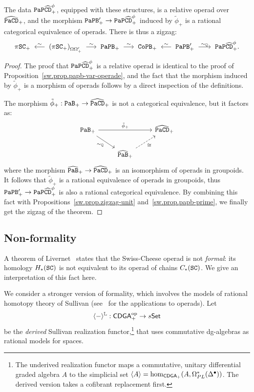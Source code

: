 \begin{theorem} \label{sw.thm.rat-model}
  The data $\mathtt{PaP}\widehat{\mathtt{CD}}_{+}^{\phi}$, equipped with these structures, is a relative operad over $\widehat{\mathtt{PaCD}}_{+}$, and the morphism $\mathtt{PaPB}'_{+} \to \mathtt{PaP}\widehat{\mathtt{CD}}_{+}^{\phi}$ induced by $\tilde\phi_{+}$ is a rational categorical equivalence of operads.
  There is thus a zigzag:
  \[ \pi \SC_{+} \qiso* \left( \pi \SC_{+} \right)_{\tMagma'_{+}} \qiso \PaPB_{+} \qiso \CoPB_{+} \qiso* \PaPB'_{+} \tkrightarrow{\sim_{\Q}} \PaPCD^{\phi}. \]
\end{theorem}

\begin{proof}
  The proof that $\mathtt{PaP}\widehat{\mathtt{CD}}_{+}^{\phi}$ is a relative operad is identical to the proof of Proposition~\ref{sw.prop.papb-var-operade}, and the fact that the morphism induced by $\tilde\phi_{+}$ is a morphism of operads follows by a direct inspection of the definitions.

  The morphism $\tilde\phi_{+} : \mathtt{PaB}_{+} \to \widehat{\mathtt{PaCD}}_{+}$ is not a
  categorical equivalence, but it factors as:
  \[\begin{tikzcd}
      \PaB_{+} \ar{rr}{\tilde\phi_{+}} \ar[swap]{dr}{\sim_{\Q}} && \PaCDhp \\
      {} & \PaBh_{+} \ar[dashed,swap]{ur}{\cong}
    \end{tikzcd}\]
  where the morphism $\widehat{\mathtt{PaB}}_{+} \to \widehat{\mathtt{PaCD}}_{+}$ is an isomorphism of operads in groupoids.
  It follows that $\tilde\phi_{+}$ is a rational equivalence of operads in groupoids, thus $\mathtt{PaPB}'_{+} \to \mathtt{PaP}\widehat{\mathtt{CD}}_{+}^{\phi}$ is also a rational categorical equivalence.
  By combining this fact with Propositions~\ref{sw.prop.zigzag-unit} and~\ref{sw.prop.papb-prime}, we finally get the zigzag of the theorem.
\end{proof}

\subsection{Non-formality}
\label{sw.sec.non-formality}

A theorem of Livernet~\cite[Theorem 3.1]{Livernet2015} states that the Swiss-Cheese operad is not \emph{formal}: its homology $H_{*}(\mathtt{SC})$ is not equivalent to its operad of chains $C_{*}(\mathtt{SC})$.
We give an interpretation of this fact here.

We consider a stronger version of formality, which involves the models of rational homotopy theory of Sullivan (see~\cite[§II]{Fresse2017} for the applications to operads).
Let
\[ \langle - \rangle^{\mathbb{L}} : \mathsf{CDGA}_{+}^{\mathrm{op}} \to s\mathsf{Set} \]
be the \emph{derived} Sullivan realization functor,\footnote{The underived realization functor maps a commutative, unitary differential graded algebra $A$ to the simplicial set $\langle A \rangle = \hom_{\mathsf{CDGA}_{+}}(A, \Omega_{PL}^{*}(\Delta^{\bullet}))$.
 The derived version takes a cofibrant replacement first.} that uses commutative dg-algebras as rational models for spaces.

